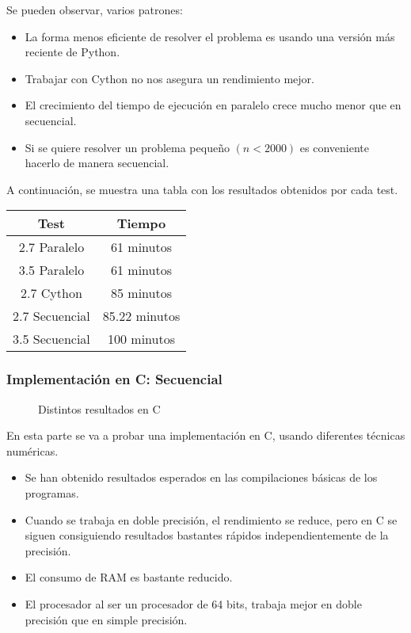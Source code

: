 \begin{ejemplo}
Se pueden observar, varios patrones:

\begin{itemize}
	\item La forma menos eficiente de resolver el problema es usando una versión más reciente de Python.
	\item Trabajar con Cython no nos asegura un rendimiento mejor.
	\item El crecimiento del tiempo de ejecución en paralelo crece mucho menor que en secuencial.
	\item Si se quiere resolver un problema pequeño $(n < 2000)$ es conveniente hacerlo de manera secuencial.
\end{itemize}

A continuación, se muestra una tabla con los resultados obtenidos por cada test.
\begin{table}[H]
	\centering
	\begin{tabular}{|c|c|}
		\hline
		\textbf{Test}  & \textbf{Tiempo}        \\ \hline
		2.7 Paralelo   & 61 minutos    \\
		3.5 Paralelo   & 61 minutos   \\
		2.7 Cython     & 85 minutos    \\
		2.7 Secuencial & 85.22 minutos \\ 
		3.5 Secuencial & 100 minutos   \\
		\hline
	\end{tabular}%
\end{table}
\subsubsection{Implementación en C: Secuencial}
\begin{figure}[H]
	\centering
	\caption{Distintos resultados en C}
	\label{fig:eulercseq}
\end{figure}
En esta parte se va a probar una implementación en C, usando diferentes técnicas numéricas.
\begin{itemize}
	\item Se han obtenido resultados esperados en las compilaciones básicas de los programas.
	\item Cuando se trabaja en doble precisión, el rendimiento se reduce, pero en C se siguen consiguiendo resultados bastantes rápidos independientemente de la precisión.
	\item El consumo de RAM es bastante reducido.
	\item El procesador al ser un procesador de 64 bits, trabaja mejor en doble precisión que en simple precisión.
\end{itemize}


\end{ejemplo}
